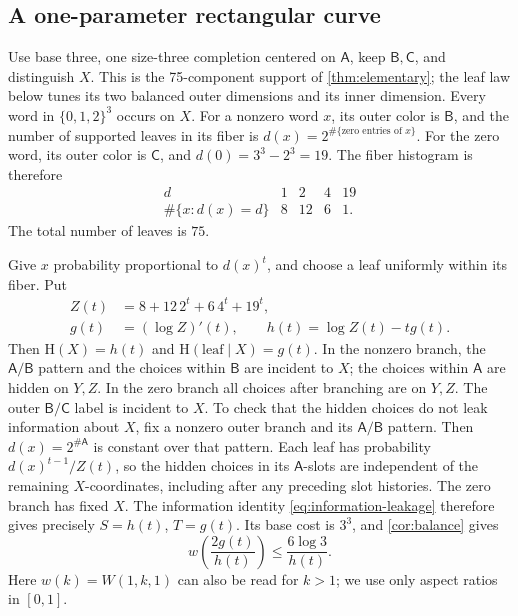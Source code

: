 \documentclass[11pt]{article}
\numberwithin{equation}{section}
\theoremstyle{definition}
\theoremstyle{remark}
\begin{document}
\subsection{A one-parameter rectangular curve}\label{subsec:curve}

Use base three, one size-three completion centered on \(\mathsf A\),
keep \(\mathsf B,\mathsf C\), and distinguish \(X\).
This is the 75-component support of \cref{thm:elementary}; the leaf
law below tunes its two balanced outer dimensions and its inner dimension.
Every word in \(\{0,1,2\}^3\) occurs on \(X\).
For a nonzero word \(x\), its outer color is \(\mathsf B\), and the number
of supported leaves in its fiber is
\(d(x)=2^{\#\{\text{zero entries of }x\}}\).
For the zero word, its outer color is \(\mathsf C\), and
\(d(0)=3^3-2^3=19\).
The fiber histogram is therefore
\[
\begin{array}{c|rrrr}
 d&1&2&4&19\\ \hline
 \#\{x:d(x)=d\}&8&12&6&1.
\end{array}
\]
The total number of leaves is \(75\).

Give \(x\) probability proportional to \(d(x)^t\), and choose a leaf
uniformly within its fiber.
Put
\begin{equation}\label{eq:curve-functions}
 \begin{split}
 Z(t)&=8+12\,2^t+6\,4^t+19^t,\\
 g(t)&=(\log Z)'(t),\qquad h(t)=\log Z(t)-tg(t).
 \end{split}
\end{equation}
Then \(\mathrm H(X)=h(t)\) and \(\mathrm H(\text{leaf}\mid X)=g(t)\).
In the nonzero branch, the \(\mathsf A/\mathsf B\) pattern and the choices
within \(\mathsf B\) are incident to \(X\); the choices within \(\mathsf A\)
are hidden on \(Y,Z\).
In the zero branch all choices after branching are on \(Y,Z\).
The outer \(\mathsf B/\mathsf C\) label is incident to \(X\).
To check that the hidden choices do not leak information about \(X\),
fix a nonzero outer branch and its \(\mathsf A/\mathsf B\) pattern.
Then \(d(x)=2^{\#\mathsf A}\) is constant over that pattern.
Each leaf has probability \(d(x)^{t-1}/Z(t)\), so the hidden choices
in its \(\mathsf A\)-slots are independent of the remaining
\(X\)-coordinates, including after any preceding slot histories.
The zero branch has fixed \(X\).  The information identity
\eqref{eq:information-leakage} therefore gives precisely
\(S=h(t)\), \(T=g(t)\).
Its base cost is \(3^3\), and \cref{cor:balance} gives
\begin{equation}\label{eq:curve-bound}
 w\!\left(\frac{2g(t)}{h(t)}\right)
       \le\frac{6\log3}{h(t)} .
\end{equation}
Here \(w(k)=W(1,k,1)\) can also be read for \(k>1\);
we use only aspect ratios in \([0,1]\).
\end{document}

